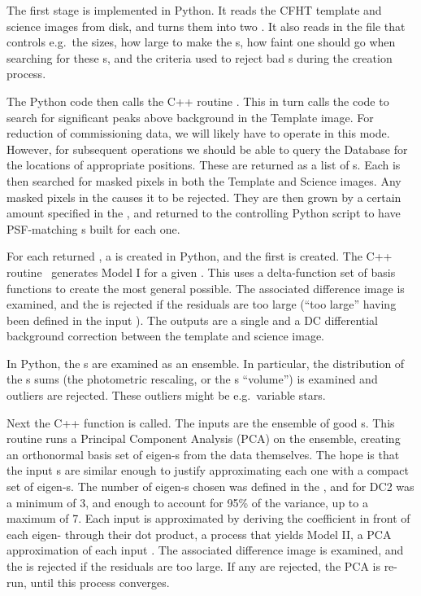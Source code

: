 The first stage is implemented in Python.  It reads the CFHT
template and science images from disk, and turns them into two
.  It also reads in the  file that
controls e.g.~the  sizes, how large to make the
s, how faint one should go when searching for these
s, and the criteria used to reject bad
s during the  creation process.

The Python code then calls the C++ routine
.  This in turn calls 
the  code to search for significant peaks above
background in the Template image.  For reduction of commissioning
data, we will likely have to operate in this mode.  However, for
subsequent operations we should be able to query the Database for the
locations of appropriate positions.  These are returned as a list of
s.  Each  is then searched for 
masked pixels in both the Template and Science images.  Any masked
pixels in the  causes it to be rejected.  They are
then grown by a certain amount specified in the , and
returned to the controlling Python script to have PSF-matching
s built for each one.

For each returned , a  is
created in Python, and the first  is created.  The
C++ routine  \
generates  Model I for a given .  This
uses a delta-function set of basis functions to create the most
general  possible.  The associated difference image is
examined, and the \code{Footprint} is rejected if the residuals are
too large (``too large'' having been defined in the input
).  The outputs are a single  and a DC
differential background correction between the template and science
image.

In Python, the s are examined as an ensemble.  In
particular, the distribution of the s sums (the
photometric rescaling, or the \code{Kernel}s ``volume'') is examined
and outliers are rejected.  These outliers might be e.g.~variable
stars.

Next the C++ function  is called.
The inputs are the ensemble of good s.  This routine runs
a Principal Component Analysis (PCA) on the ensemble, creating an
orthonormal basis set of eigen-s from the data
themselves.  The hope is that the input s are
similar enough to justify approximating each one with a compact
set of eigen-s.  The number of eigen-\code{Kernel}s
chosen was defined in the \code{Policy}, and for DC2 was a minimum of
3, and enough to account for 95\% of the variance, up to a maximum
of 7.
%
Each input  is approximated by deriving the coefficient
in front of each eigen- through their dot product, a
process that yields  Model II, a PCA approximation of
each input \code{Kernel}.  The associated difference image is
examined, and the  is rejected if the residuals are
too large.  If any are rejected, the PCA is re-run, until this
process converges.

